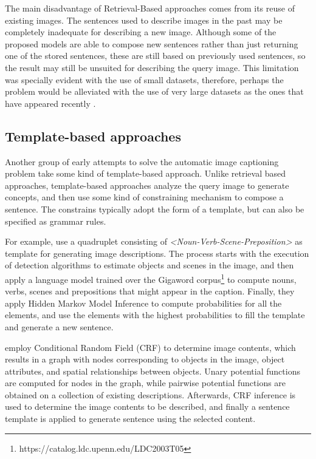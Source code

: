 The main disadvantage of Retrieval-Based approaches comes from its reuse of existing images. The sentences used to describe images in the past may be completely inadequate for describing a new image. Although some of the proposed models are able to compose new sentences rather than just returning one of the stored sentences, these are still based on previously used sentences, so the result may still be unsuited for describing the query image. This limitation was specially evident with the use of small datasets, therefore, perhaps the problem would be alleviated with the use of very large datasets as the ones that have appeared recently \citet{Lin2014, Sharma2018}.

\subsection{Template-based approaches}\label{sec:template-based_methods}

Another group of early attempts to solve the automatic image captioning problem take some kind of template-based approach. Unlike retrieval based approaches, template-based approaches analyze the query image to generate concepts, and then use some kind of constraining mechanism to compose a sentence. The constrains typically adopt the form of a template, but can also be specified as grammar rules.

For example, \citet{Yang2011} use a quadruplet consisting of \textit{<Noun-Verb-Scene-Preposition>} as template for generating image descriptions. The process starts with the execution of detection algorithms to estimate objects and scenes in the image, and then apply a language model trained over the Gigaword corpus\footnote{https://catalog.ldc.upenn.edu/LDC2003T05} to compute nouns, verbs, scenes and prepositions that might appear in the caption. Finally, they apply Hidden Markov Model Inference to compute probabilities for all the elements, and use the elements with the highest probabilities to fill the template and generate a new sentence.

\citet{Kulkarni2011} employ Conditional Random Field (CRF) to determine image contents, which results in a graph with nodes corresponding to objects in the image, object attributes, and spatial relationships between objects. Unary potential functions are computed for nodes in the graph, while pairwise potential functions are obtained on a collection of existing descriptions. Afterwards, CRF inference is used to determine the image contents to be described, and finally a sentence template is applied to generate sentence using the selected content.

